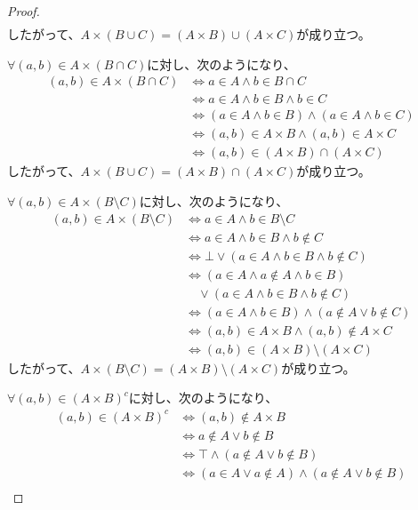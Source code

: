 \documentclass[a4paper]{jsarticle}
\begin{document}
\begin{proof}
\begin{align*}
\end{align*}
したがって、$A \times (B \cup C) = (A \times B) \cup (A \times C)$が成り立つ。\par
$\forall(a,b) \in A \times (B \cap C)$に対し、次のようになり、
\begin{align*}
(a,b) \in A \times (B \cap C) &\Leftrightarrow a \in A \land b \in B \cap C\\
&\Leftrightarrow a \in A \land b \in B \land b \in C\\
&\Leftrightarrow (a \in A \land b \in B) \land (a \in A \land b \in C)\\
&\Leftrightarrow (a,b) \in A \times B \land (a,b) \in A \times C\\
&\Leftrightarrow (a,b) \in (A \times B) \cap (A \times C)
\end{align*}
したがって、$A \times (B \cup C) = (A \times B) \cap (A \times C)$が成り立つ。\par
$\forall(a,b) \in A \times (B \setminus C)$に対し、次のようになり、
\begin{align*}
(a,b) \in A \times (B \setminus C) &\Leftrightarrow a \in A \land b \in B \setminus C\\
&\Leftrightarrow a \in A \land b \in B \land b \notin C\\
&\Leftrightarrow \bot \vee (a \in A \land b \in B \land b \notin C)\\
&\Leftrightarrow (a \in A \land a \notin A \land b \in B) \\
&\quad \vee (a \in A \land b \in B \land b \notin C)\\
&\Leftrightarrow (a \in A \land b \in B) \land (a \notin A \vee b \notin C)\\
&\Leftrightarrow (a,b) \in A \times B \land (a,b) \notin A \times C\\
&\Leftrightarrow (a,b) \in (A \times B) \setminus (A \times C)
\end{align*}
したがって、$A \times (B \setminus C) = (A \times B) \setminus (A \times C)$が成り立つ。\par
$\forall(a,b) \in (A \times B)^{c}$に対し、次のようになり、
\begin{align*}
(a,b) \in (A \times B)^{c} &\Leftrightarrow (a,b) \notin A \times B\\
&\Leftrightarrow a \notin A \vee b \notin B\\
&\Leftrightarrow \top \land (a \notin A \vee b \notin B)\\
&\Leftrightarrow (a \in A \vee a \notin A) \land (a \notin A \vee b \notin B)\\

\end{align*}
\end{proof}
\end{document}
